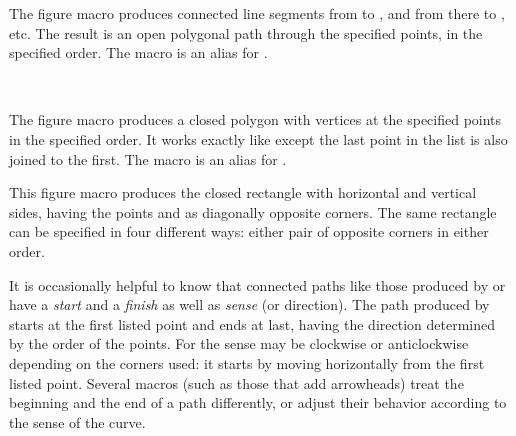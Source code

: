 \documentclass[letterpaper]{article}
\begin{document}
The figure macro  produces connected line segments from
 to , and from there to , etc. The
result is an open polygonal path through the specified points, in the
specified order. The macro  is an alias for .

\begin{cd}
\\
%
%
\end{cd}

The figure macro  produces a closed polygon with vertices
at the specified points in the specified order. It works exactly like
 except the last point in the list is also joined to the
first. The macro  is an alias for .

\begin{cd}
%
\end{cd}

This figure macro produces the closed rectangle with horizontal and
vertical sides, having the points  and  as
diagonally opposite corners. The same rectangle can be specified in four
different ways: either pair of opposite corners in either order.

It is occasionally helpful to know that connected paths like those
produced by  or  have a \emph{start} and a
\emph{finish} as well as \emph{sense} (or direction). The path produced
by  starts at the first listed point and ends at last,
having the direction determined by the order of the points. For
 the sense may be clockwise or anticlockwise depending on the
corners used: it starts by moving horizontally from the first listed
point. Several \mfp{} macros (such as those that add arrowheads) treat
the beginning and the end of a path differently, or adjust their
behavior according to the sense of the curve.

\begin{cd}
%
\end{cd}
\end{document}
